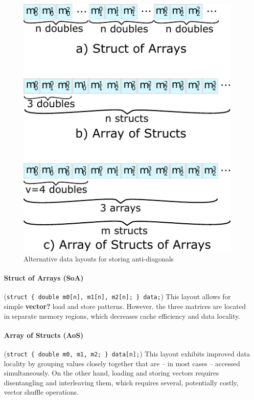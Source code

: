 \documentclass[runningheads,a4paper]{llncs}
\begin{document}
\begin{figure}[ht!]
  \centering
  \includegraphics[scale=0.7]{figures/datalayout.pdf}
  \caption{Alternative data layouts for storing anti-diagonals}
  \label{fig:datalayout}
\end{figure}

\paragraph*{Struct of Arrays (SoA)} ({\small\texttt{struct \{ double m0[n], m1[n], m2[n]; \} data;}}) 
This layout allows for simple {\bf vector?} load and store patterns. 
However, the three matrices are located in separate memory regions, which decreases
cache efficiency and data locality.

\paragraph*{Array of Structs (AoS)} ({\small\texttt{struct \{ double m0, m1, m2; \}
data[n];}}) This layout exhibits improved data locality by grouping values
closely together that are -- in most cases -- accessed simultaneously. On the
other hand, loading and storing vectors requires disentangling and interleaving
them, which requires several, potentially costly, vector shuffle operations. 
\end{document}
